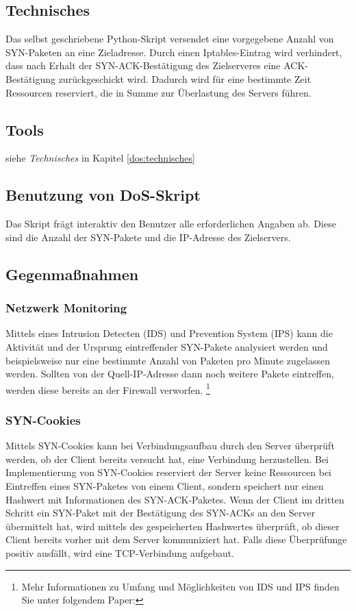 \subsection*{Technisches}
\label{dos:technisches}
Das selbst geschriebene Python-Skript versendet eine vorgegebene Anzahl von SYN-Paketen an eine Zieladresse. Durch einen Iptables-Eintrag wird verhindert, dass nach Erhalt der SYN-ACK-Bestätigung
des Zielserveres eine ACK-Bestätigung zurückgeschickt wird. Dadurch wird für eine bestimmte Zeit Ressourcen reserviert, die in Summe zur Überlastung des Servers führen.

\subsection*{Tools}
siehe \textit{Technisches} in Kapitel \ref{dos:technisches}

\subsection*{Benutzung von DoS-Skript}
Das Skript frägt interaktiv den Benutzer alle erforderlichen Angaben ab. Diese sind die Anzahl der SYN-Pakete und die IP-Adresse des Zielservers.

\subsection*{Gegenmaßnahmen}

\subsubsection*{Netzwerk Monitoring}
Mittels eines Intrusion Detecten (IDS) und Prevention System (IPS) kann die Aktivität und der Ursprung eintreffender SYN-Pakete analysiert werden und beispielsweise nur eine bestimmte Anzahl von Paketen pro
Minute zugelassen werden. Sollten von der Quell-IP-Adresse dann noch weitere Pakete eintreffen, werden diese bereits an der Firewall verworfen. \footnote{Mehr Informationen zu Umfang und Möglichkeiten von IDS und IPS finden Sie unter folgendem Paper:\cite{differenceipsids}} 

\subsubsection*{SYN-Cookies}
Mittels SYN-Cookies kann bei Verbindungsaufbau durch den Server überprüft werden, ob der Client bereits versucht hat, eine Verbindung herzustellen. Bei Implementierung von SYN-Cookies reserviert der Server keine Ressourcen bei Eintreffen eines SYN-Paketes von einem Client, sondern speichert nur einen Hashwert mit Informationen des SYN-ACK-Paketes. Wenn der Client im dritten Schritt ein SYN-Paket mit der Bestätigung des SYN-ACKs an den Server übermittelt hat, wird mittels des gespeicherten Hashwertes überprüft, ob dieser Client bereits vorher mit dem Server kommuniziert hat. Falls diese Überprüfunge positiv ausfällt, wird eine TCP-Verbindung aufgebaut.\newpage


